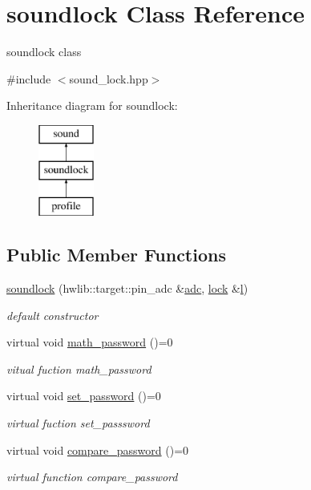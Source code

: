 \hypertarget{classsoundlock}{}\section{soundlock Class Reference}
\label{classsoundlock}


soundlock class  




{\ttfamily \#include $<$sound\+\_\+lock.\+hpp$>$}

Inheritance diagram for soundlock\+:\begin{figure}[H]
\begin{center}
\leavevmode
\includegraphics[height=3.000000cm]{classsoundlock}
\end{center}
\end{figure}
\subsection*{Public Member Functions}
\begin{DoxyCompactItemize}
\item 
\hyperlink{classsoundlock_abcac8ac82db4e9cc69c4b0d0ac379a40}{soundlock} (hwlib\+::target\+::pin\+\_\+adc \&\hyperlink{classsound_a1b4c38e994daa1b3e9006852d3d9242a}{adc}, \hyperlink{classlock}{lock} \&\hyperlink{classsoundlock_ade415e22f230dca2d7e7f93d14cec8b6}{l})
\begin{DoxyCompactList}\small\item\em default constructor \end{DoxyCompactList}\item 
virtual void \hyperlink{classsoundlock_ac5e780fa2d0688bee28dbce04dd75a37}{math\+\_\+password} ()=0
\begin{DoxyCompactList}\small\item\em vitual fuction math\+\_\+password \end{DoxyCompactList}\item 
virtual void \hyperlink{classsoundlock_a27ab4e3e5808d7dbc572e865a97e8f9c}{set\+\_\+password} ()=0
\begin{DoxyCompactList}\small\item\em virtual fuction set\+\_\+passsword \end{DoxyCompactList}\item 
virtual void \hyperlink{classsoundlock_abca4638dd9dd78157c2c18165407965e}{compare\+\_\+password} ()=0
\begin{DoxyCompactList}\small\item\em virtual function compare\+\_\+password \end{DoxyCompactList}\end{DoxyCompactItemize}
